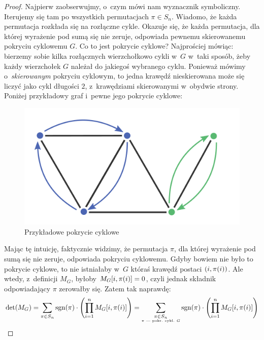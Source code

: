 \begin{proof}
	Najpierw zaobserwujmy, o~czym mówi nam wyznacznik symboliczny. Iterujemy się tam po wszystkich permutacjach $\pi \in S_n$. Wiadomo, że każda permutacja rozkłada się na rozłączne cykle. Okazuje się, że każda permutacja, dla której wyrażenie pod sumą się nie zeruje, odpowiada pewnemu skierowanemu pokryciu cyklowemu $G$. Co to jest pokrycie cyklowe? Najprościej mówiąc: bierzemy sobie kilka rozłącznych wierzchołkowo cykli w~$G$ w~taki sposób, żeby każdy wierzchołek $G$ należał do jakiegoś wybranego cyklu. Ponieważ mówimy o~\emph{skierowanym} pokryciu cyklowym, to jedna krawędź nieskierowana może się liczyć jako cykl długości $2$, z~krawędziami skierowanymi w~obydwie strony. Poniżej przykładowy graf i~pewne jego pokrycie cyklowe:

	\begin{figure}[H]
		\centering
		\includegraphics[scale=0.75]{images/tutte/decomposed_graph.png}
		\caption{Przykładowe pokrycie cyklowe}
	\end{figure}

	Mając tę intuicję, faktycznie widzimy, że permutacja $\pi$, dla której wyrażenie pod sumą się nie zeruje, odpowiada pokryciu cyklowemu. Gdyby bowiem nie było to pokrycie cyklowe, to nie istniałaby w~$G$ któraś krawędź postaci $\pars{i, \pi\pars{i}}$. Ale wtedy, z~definicji $M_G$, byłoby $M_G[i, \pi\pars{i}] = 0$, czyli jednak składnik odpowiadający $\pi$ zerowałby się. Zatem tak naprawdę:
	\begin{equation*}
		\det\pars{M_G}
		= \sum_{\pi \in S_n}\sgn\pars{\pi} \cdot \pars{\prod_{i = 1}^{n}M_G[i, \pi\pars{i}]}
		= \sum_{\substack{\pi \in S_n\\\text{\tiny $\pi$ --- pokr. cykl. $G$}}}\sgn\pars{\pi} \cdot \pars{\prod_{i = 1}^{n}M_G[i, \pi\pars{i}]}
	\end{equation*}


\end{proof}

